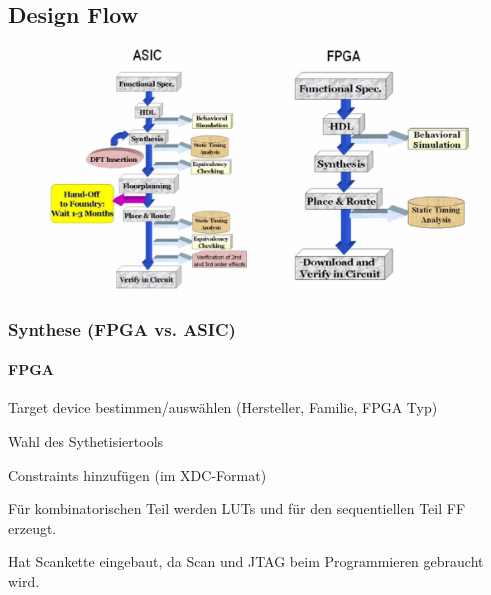 \subsection{Design Flow}
\begin{figure}[H]
    \includegraphics[width=1\textwidth]{images/ASIC_FPGA.png}
\end{figure}
\subsubsection{Synthese (FPGA vs. ASIC)}
\paragraph{FPGA}
\begin{compactitem}
    \item Target device bestimmen/auswählen (Hersteller, Familie, FPGA Typ)
    \item Wahl des Sythetisiertools
    \item Constraints hinzufügen (im XDC-Format)
    \item Für kombinatorischen Teil werden LUTs und für den sequentiellen Teil FF erzeugt.
    \item Hat Scankette eingebaut, da Scan und JTAG beim Programmieren gebraucht wird.
\end{compactitem}
